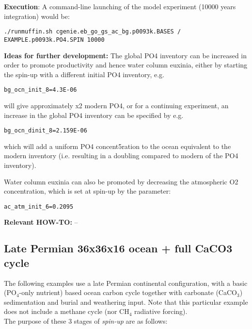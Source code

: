 \documentclass[10pt,twoside]{article}
\begin{document}
\noindent \textbf{Execution}: A command-line launching of the model experiment (10000 years integration) would be:
\vspace{-10pt}\begin{verbatim}./runmuffin.sh cgenie.eb_go_gs_ac_bg.p0093k.BASES /
EXAMPLE.p0093k.PO4.SPIN 10000\end{verbatim}\vspace{-5pt}

\noindent \textbf{Ideas for further development:} The global PO4 inventory can be increased in order to promote productivity and hence water column euxinia, either by starting the spin-up with a different initial PO4 inventory, e.g.
\vspace{-10pt}\begin{verbatim}bg_ocn_init_8=4.3E-06\end{verbatim}\vspace{-10pt}
will give approximately x2 modern PO4, or for a continuing experiment, an increase in the global PO4 inventory can be specified by e.g.
\vspace{-10pt}\begin{verbatim}bg_ocn_dinit_8=2.159E-06\end{verbatim}\vspace{-10pt}
which will add a uniform PO4 concent5ration to the ocean equivalent to the modern inventory (i.e. resulting in a doubling compared to modern of the PO4 inventory).

\noindent Water column euxinia can also be promoted by decreasing the atmospheric O2 concentration, which is set at spin-up by the parameter:
\vspace{-10pt}\begin{verbatim}ac_atm_init_6=0.2095\end{verbatim}\vspace{-10pt}

\noindent \textbf{Relevant HOW-TO:} --


\subsection{Late Permian 36x36x16 ocean + full CaCO3 cycle}

The following examples use a late Permian continental configuration, with a basic (PO$_{4}$-only nutrient) based ocean carbon cycle together with carbonate (CaCO$_{3}$) sedimentation and burial and weathering input.
Note that this particular example does not include a methane cycle (nor CH$_{4}$ radiative forcing).
\\ The purpose of these 3 stages of \textit{spin-up} are as follows:
\end{document}
